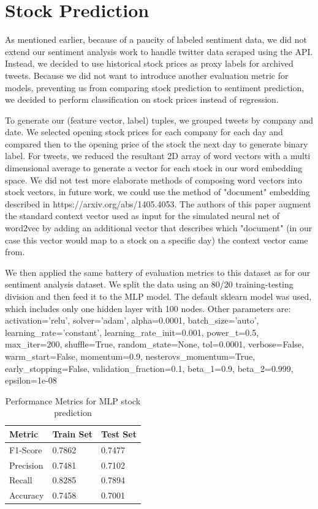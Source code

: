 \documentclass{sig-alternate-05-2015}
\begin{document}
	\section{Stock Prediction} 
As mentioned earlier, because of a paucity of labeled sentiment data, we did not extend our sentiment analysis work to handle twitter data scraped using the API.  Instead, we decided to use historical stock prices as proxy labels for archived tweets.  Because we did not want to introduce another evaluation metric for models, preventing us from comparing stock prediction to sentiment prediction, we decided to perform classification on stock prices instead of regression. 
\par
To generate our (feature vector, label) tuples, we grouped tweets by company and date.  We selected opening stock prices for each company for each day and compared then to the opening price of the stock the next day to generate binary label.  For tweets, we reduced the resultant 2D array of word vectors with a multi dimensional average to generate a vector for each stock in our word embedding space.  We did not test more elaborate methods of composing word vectors into stock vectors, in future work, we could use the method of "document" embedding described in https://arxiv.org/abs/1405.4053.  The authors of this paper augment the standard context vector used as input for the simulated neural net of word2vec by adding an additional vector that describes which "document" (in our case this vector would map to a stock on a specific day) the context vector came from.
\par
We then applied the same battery of evaluation metrics to this dataset as for our sentiment analysis dataset. We split the data using an 80/20 training-testing division and then feed it to the MLP model. The default sklearn model was used, which includes only one hidden layer with 100 nodes. Other parameters are:  activation='relu', solver='adam', alpha=0.0001, batch\_size='auto', learning\_rate='constant', learning\_rate\_init=0.001, power\_t=0.5, max\_iter=200, shuffle=True, random\_state=None, tol=0.0001, verbose=False, warm\_start=False, momentum=0.9, nesterovs\_momentum=True, early\_stopping=False, validation\_fraction=0.1, beta\_1=0.9, beta\_2=0.999, epsilon=1e-08

\begin{table}[H]
	\centering
	\caption{Performance Metrics for MLP stock prediction}
	\label{my-label}
	\begin{tabular}{@{}lll@{}}
		\toprule
		\textbf{Metric} & \textbf{Train Set} & \textbf{Test Set} \\ \midrule
		F1-Score        & 0.7862                 & 0.7477                \\
		Precision       & 0.7481                 & 0.7102                \\
		Recall          & 0.8285                 & 0.7894                \\
		Accuracy        & 0.7458                 & 0.7001                \\ \bottomrule
	\end{tabular}
\end{table}
\end{document}

